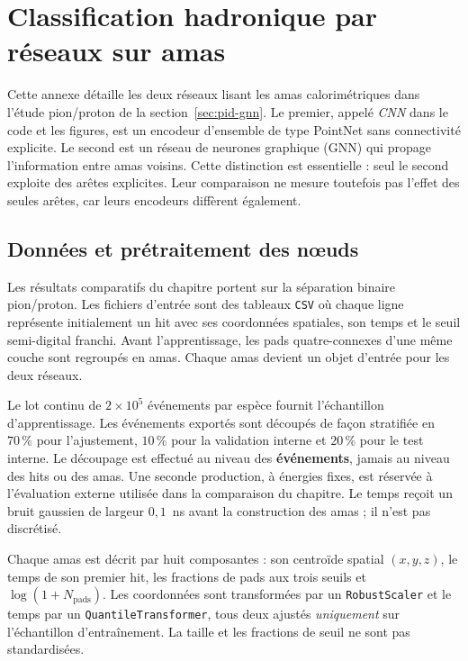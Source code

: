 \chapter{Classification hadronique par réseaux sur amas}
\label{app:gnn}

Cette annexe détaille les deux réseaux lisant les amas calorimétriques dans l'étude pion/proton de la section~\ref{sec:pid-gnn}. Le premier, appelé \emph{CNN} dans le code et les figures, est un encodeur d'ensemble de type PointNet sans connectivité explicite. Le second est un réseau de neurones graphique (GNN) qui propage l'information entre amas voisins. Cette distinction est essentielle : seul le second exploite des arêtes explicites. Leur comparaison ne mesure toutefois pas l'effet des seules arêtes, car leurs encodeurs diffèrent également.

\section{Données et prétraitement des nœuds}

Les résultats comparatifs du chapitre portent sur la séparation binaire pion/proton. Les fichiers d'entrée sont des tableaux \texttt{CSV} où chaque ligne représente initialement un hit avec ses coordonnées spatiales, son temps et le seuil semi-digital franchi. Avant l'apprentissage, les pads quatre-connexes d'une même couche sont regroupés en amas. Chaque amas devient un objet d'entrée pour les deux réseaux.

Le lot continu de $2\times10^{5}$ événements par espèce fournit l'échantillon d'apprentissage. Les événements exportés sont découpés de façon stratifiée en $70\,\%$ pour l'ajustement, $10\,\%$ pour la validation interne et $20\,\%$ pour le test interne. Le découpage est effectué au niveau des \textbf{événements}, jamais au niveau des hits ou des amas. Une seconde production, à énergies fixes, est réservée à l'évaluation externe utilisée dans la comparaison du chapitre. Le temps reçoit un bruit gaussien de largeur $0{,}1$~ns avant la construction des amas ; il n'est pas discrétisé.

Chaque amas est décrit par huit composantes : son centroïde spatial $(x,y,z)$, le temps de son premier hit, les fractions de pads aux trois seuils et $\log(1+N_{\mathrm{pads}})$. Les coordonnées sont transformées par un \texttt{RobustScaler} et le temps par un \texttt{QuantileTransformer}, tous deux ajustés \emph{uniquement} sur l'échantillon d'entraînement. La taille et les fractions de seuil ne sont pas standardisées.

